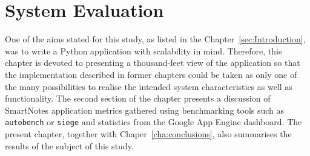 \chapter{System Evaluation}\label{chap:eval}
One of the aims stated for this study, as listed in the Chapter~\ref{sec:Introduction}, was to write a Python application with scalability in mind. Therefore, this chapter is devoted to presenting a thousand-feet view of the application so that the implementation described in former chapters could be taken as only one of the many possibilities to realise the intended system characteristics as well as functionality. The second section of the chapter presents a discussion of SmartNotes application metrics gathered using benchmarking tools such as \texttt{autobench} or \texttt{siege} and statistics from the Google App Engine dashboard. The present chapter, together with Chaper~\ref{cha:conclusions}, also summarises the results of the subject of this study. 
 

